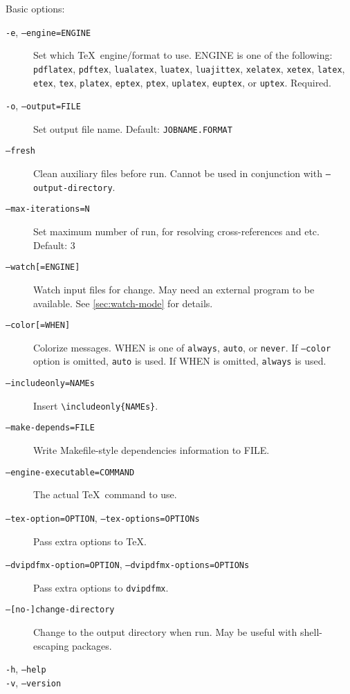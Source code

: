 \documentclass[a4paper]{report}
\newcommand\texcmd[1]{\texttt{\textbackslash #1}}
\newcommand\metavar[1]{\textnormal{\textsf{#1}}}
\begin{document}
Basic options:
\begin{description}
\item[\texttt{-e}, \texttt{--engine=\metavar{ENGINE}}]
  Set which \TeX\ engine/format to use.
  \metavar{ENGINE} is one of the following:
  \texttt{pdflatex}, \texttt{pdftex},
  \texttt{lualatex}, \texttt{luatex}, \texttt{luajittex},
  \texttt{xelatex}, \texttt{xetex},
  \texttt{latex}, \texttt{etex}, \texttt{tex},
  \texttt{platex}, \texttt{eptex}, \texttt{ptex},
  \texttt{uplatex}, \texttt{euptex}, or \texttt{uptex}.
  Required.
\item[\texttt{-o}, \texttt{--output=\metavar{FILE}}]
  Set output file name.
  Default: \texttt{\metavar{JOBNAME}.\metavar{FORMAT}}
\item[\texttt{--fresh}]
  Clean auxiliary files before run.
  Cannot be used in conjunction with \texttt{--output-directory}.
\item[\texttt{--max-iterations=\metavar{N}}]
  Set maximum number of run, for resolving cross-references and etc.
  Default: 3
\item[\texttt{--watch[=\metavar{ENGINE}]}]
  Watch input files for change.
  May need an external program to be available.
  See \autoref{sec:watch-mode} for details.
\item[\texttt{--color[=\metavar{WHEN}]}]
  Colorize messages.
  \metavar{WHEN} is one of \texttt{always}, \texttt{auto}, or \texttt{never}.
  If \texttt{--color} option is omitted, \texttt{auto} is used.
  If \metavar{WHEN} is omitted, \texttt{always} is used.
\item[\texttt{--includeonly=\metavar{NAMEs}}]
  Insert \texttt{\texcmd{includeonly}\{\metavar{NAMEs}\}}.
\item[\texttt{--make-depends=\metavar{FILE}}]
  Write Makefile-style dependencies information to \metavar{FILE}.
\item[\texttt{--engine-executable=\metavar{COMMAND}}]
  The actual \TeX\ command to use.
\item[\texttt{--tex-option=\metavar{OPTION}}, \texttt{--tex-options=\metavar{OPTIONs}}]
  Pass extra options to \TeX.
\item[\texttt{--dvipdfmx-option=\metavar{OPTION}}, \texttt{--dvipdfmx-options=\metavar{OPTIONs}}]
  Pass extra options to \texttt{dvipdfmx}.
\item[\texttt{--[no-]change-directory}]
  Change to the output directory when run.
  May be useful with shell-escaping packages.
\item[\texttt{-h}, \texttt{--help}]
\item[\texttt{-v}, \texttt{--version}]

\end{description}
\end{document}
